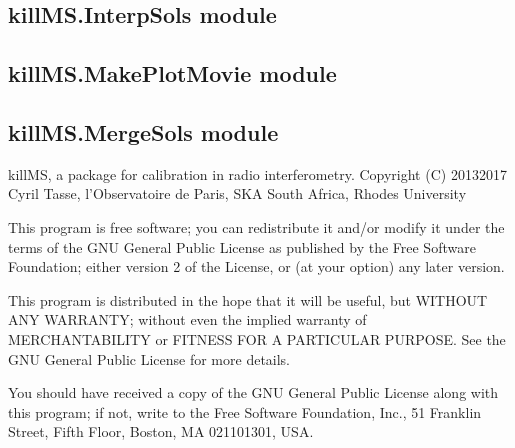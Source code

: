 \documentclass[letterpaper,10pt,english]{sphinxmanual}
\begin{document}

\begin{fulllineitems}
\label{\detokenize{api/killMS:killMS.ClipCal.read_options}}
\pysigstartsignatures
{}
\pysigstopsignatures
\end{fulllineitems}



\subsection{killMS.InterpSols module}
\label{\detokenize{api/killMS:killms-interpsols-module}}

\subsection{killMS.MakePlotMovie module}
\label{\detokenize{api/killMS:killms-makeplotmovie-module}}

\subsection{killMS.MergeSols module}
\label{\detokenize{api/killMS:module-killMS.MergeSols}}\label{\detokenize{api/killMS:killms-mergesols-module}}
\sphinxAtStartPar
killMS, a package for calibration in radio interferometry.
Copyright (C) 2013\sphinxhyphen{}2017  Cyril Tasse, l’Observatoire de Paris,
SKA South Africa, Rhodes University

\sphinxAtStartPar
This program is free software; you can redistribute it and/or
modify it under the terms of the GNU General Public License
as published by the Free Software Foundation; either version 2
of the License, or (at your option) any later version.

\sphinxAtStartPar
This program is distributed in the hope that it will be useful,
but WITHOUT ANY WARRANTY; without even the implied warranty of
MERCHANTABILITY or FITNESS FOR A PARTICULAR PURPOSE.  See the
GNU General Public License for more details.

\sphinxAtStartPar
You should have received a copy of the GNU General Public License
along with this program; if not, write to the Free Software
Foundation, Inc., 51 Franklin Street, Fifth Floor, Boston, MA  02110\sphinxhyphen{}1301, USA.
\end{document}
